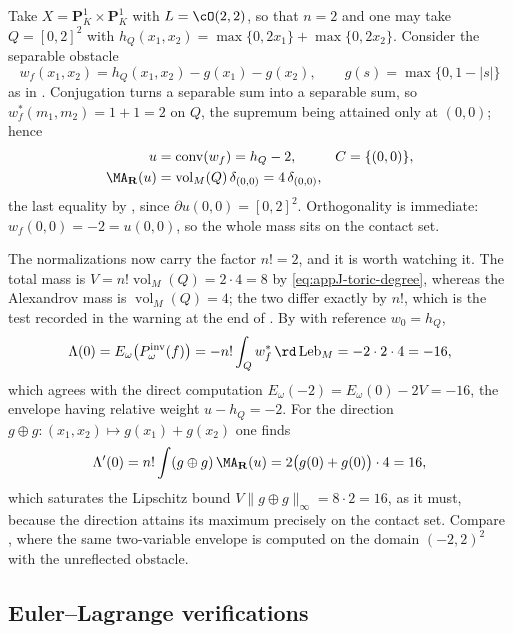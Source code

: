 \begin{example}
\label{ex:ch27-toric-two-variables}
Take \(X=\mathbf P^1_K\times\mathbf P^1_K\) with
\(L=\cO(2,2)\), so that \(n=2\) and one may take \(Q=[0,2]^2\) with
\(h_Q(x_1,x_2)=\max\{0,2x_1\}+\max\{0,2x_2\}\).  Consider the separable
obstacle
\[
 w_f(x_1,x_2)=h_Q(x_1,x_2)-g(x_1)-g(x_2),
 \qquad g(s)=\max\{0,1-|s|\}
\]
as in .  Conjugation turns a separable sum into
a separable sum, so
\(w_f^*(m_1,m_2)=1+1=2\) on \(Q\), the supremum being attained only at
\((0,0)\); hence
\[
 \begin{aligned}
 u&=\operatorname{conv}(w_f)=h_Q-2,
 &C&=\{(0,0)\},\\
 \MA_{\mathbf R}(u)
   &=\operatorname{vol}_M(Q)\,\delta_{(0,0)}
   =4\,\delta_{(0,0)},
 \end{aligned}
\]
the last equality by , since
\(\partial u(0,0)=[0,2]^2\).  Orthogonality is immediate:
\(w_f(0,0)=-2=u(0,0)\), so the whole mass sits on the contact set.

The normalizations now carry the factor \(n!=2\), and it is worth watching
it.  The total mass is
\(V=n!\operatorname{vol}_M(Q)=2\cdot4=8\) by
\eqref{eq:appJ-toric-degree}, whereas the Alexandrov mass is
\(\operatorname{vol}_M(Q)=4\); the two differ exactly by \(n!\), which is
the test recorded in the warning at the end of
.  By  with reference
\(w_0=h_Q\),
\[
 \Lambda(0)=E_\omega\bigl(P^{\mathrm{inv}}_\omega(f)\bigr)
 =-n!\int_Qw_f^*\,\rd\operatorname{Leb}_M=-2\cdot2\cdot4=-16 ,
\]
which agrees with the direct computation
\(E_\omega(-2)=E_\omega(0)-2V=-16\), the envelope having relative weight
\(u-h_Q=-2\).  For the direction
\(g\oplus g:(x_1,x_2)\mapsto g(x_1)+g(x_2)\) one finds
\[
 \Lambda'(0)=n!\int(g\oplus g)\,\MA_{\mathbf R}(u)
 =2\bigl(g(0)+g(0)\bigr)\cdot4=16,
\]
which saturates the Lipschitz bound
\(V\lVert g\oplus g\rVert_\infty=8\cdot2=16\), as it must, because the
direction attains its maximum precisely on the contact set.  Compare
, where the same two-variable envelope is
computed on the domain \((-2,2)^2\) with the unreflected obstacle.
\end{example}

\subsection{Euler--Lagrange verifications}
\label{sec:ch27-euler-lagrange-numbers}

